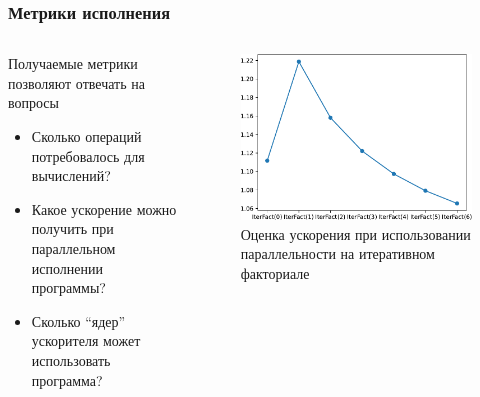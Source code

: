 \documentclass
  [ russian
  , aspectratio=169 %
  ] {beamer}
\begin{document}
\begin{frame}
    \frametitle{Метрики исполнения}

    \begin{columns}
        \begin{column}{0.45\linewidth}
            Получаемые метрики позволяют отвечать на вопросы
            \begin{itemize}
                \item Сколько операций потребовалось для вычислений?
                \item Какое ускорение можно получить при параллельном исполнении программы?
                \item Сколько \enquote{ядер} ускорителя может использовать программа?
            \end{itemize}
        \end{column}
        \begin{column}{0.5\linewidth}
            \begin{figure}
                \begin{center}
                    \includegraphics[width=\linewidth, page=2]{figures/Figures_cropped.pdf}
                \end{center}
                \caption{Оценка ускорения при использовании параллельности на итеративном факториале}
            \end{figure}
        \end{column}
    \end{columns}

\end{frame}
\end{document}
